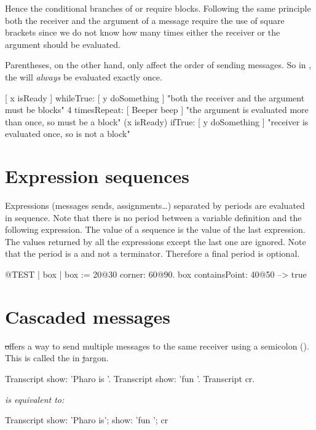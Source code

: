 \documentclass[a4paper,10pt,twoside]{book}
\begin{document}
Hence the conditional branches of  or  require blocks. Following the same principle both the receiver and the argument of a  message require the use of square brackets since we do not know how many times either the receiver or the argument should be evaluated.

Parentheses, on the other hand, only affect the order of sending messages.
So in , the  will \emph{always} be evaluated exactly once.

\begin{code}{}
[ x isReady ] whileTrue: [ y doSomething ]   "both the receiver and the argument must be blocks"
4 timesRepeat: [ Beeper beep ]                   "the argument is evaluated more than once, so must be a block"
(x isReady) ifTrue: [ y doSomething ]           "receiver is evaluated once, so is not a block"
\end{code}

\section{Expression sequences}
Expressions (\ie messages sends, assignments\dots) separated by periods are evaluated in sequence.
Note that there is no period between a variable definition and the following expression.
The value of a sequence is the value of the last expression. The values returned by all the 
expressions except the last one are ignored. Note that the period is a  and not a terminator. Therefore a final period is optional.

\begin{code}{@TEST}
| box |
box := 20@30 corner: 60@90.
box containsPoint: 40@50 --> true
\end{code}

\section{Cascaded messages}
\st offers a way to send multiple messages to the same receiver using a semicolon (\ct{;}). This is called the  in \st jargon.


\begin{minipage}{0.35\textwidth}
\begin{code}{}
Transcript show: 'Pharo is '.
Transcript show: 'fun '.
Transcript cr.
\end{code}
\end{minipage}
\emph{is equivalent to:}
\begin{minipage}{0.35\textwidth}
\begin{code}{}
Transcript        
   show: 'Pharo is';
   show: 'fun ';
   cr
\end{code}
\end{minipage}
\end{document}
